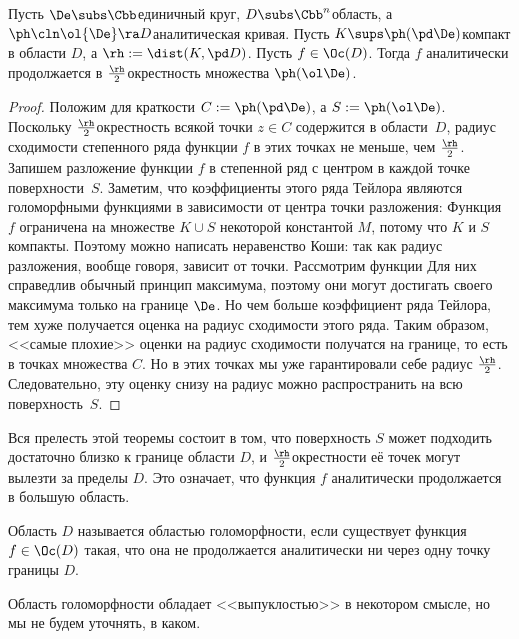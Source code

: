 \documentclass[a4paper]{article}
\begin{document}
\begin{theorem}
Пусть $\De \subs \Cbb$\т единичный круг, $D \subs \Cbb^n$\т область,
а $\ph\cln \ol{\De}\ra D$\т аналитическая кривая.
Пусть $K \sups \ph(\pd\De)$\т компакт в области $D$, а $\rh := \dist(K, \pd D)$.
Пусть $f \in \Oc(D)$. Тогда $f$ аналитически продолжается в $\frac\rh2$\д окрестность множества $\ph(\ol\De)$.
\end{theorem}
\begin{proof}
Положим для краткости $C := \ph(\pd\De)$, а $S := \ph(\ol\De)$.
Поскольку $\frac\rh2$\д окрестность всякой точки $z \in C$
содержится в области~$D$, радиус сходимости степенного ряда функции $f$ в этих точках не меньше,
чем $\frac\rh2$. Запишем разложение функции $f$ в степенной ряд с центром в каждой точке поверхности~$S$.
Заметим, что коэффициенты этого ряда Тейлора являются голоморфными функциями в зависимости от центра точки
разложения:
Функция $f$ ограничена на множестве $K \cup S$ некоторой константой $M$, потому что $K$ и $S$\т компакты.
Поэтому можно написать неравенство Коши:
так как радиус разложения, вообще говоря, зависит от точки.
Рассмотрим функции
Для них справедлив обычный принцип максимума, поэтому они могут достигать своего максимума
только на границе $\De$. Но чем больше коэффициент ряда Тейлора, тем хуже получается
оценка на радиус сходимости этого ряда. Таким образом, <<самые плохие>> оценки на радиус
сходимости получатся на границе, то есть в точках множества $C$. Но в этих точках
мы уже гарантировали себе радиус $\frac\rh2$. Следовательно, эту оценку снизу на радиус
можно распространить на всю поверхность~$S$.
\end{proof}

\begin{note}
Вся прелесть этой теоремы состоит в том, что поверхность $S$ может подходить достаточно
близко к границе области $D$, и $\frac\rh2$\д окрестности её точек могут вылезти за пределы $D$.
Это означает, что функция $f$ аналитически продолжается в большую область.
\end{note}

\begin{df}
Область $D$ называется областью голоморфности, если существует функция $f \in\Oc(D)$ такая,
что она не продолжается аналитически ни через одну точку границы $D$.
\end{df}

Область голоморфности обладает <<выпуклостью>> в некотором смысле, но мы не будем уточнять, в каком.
\end{document}
